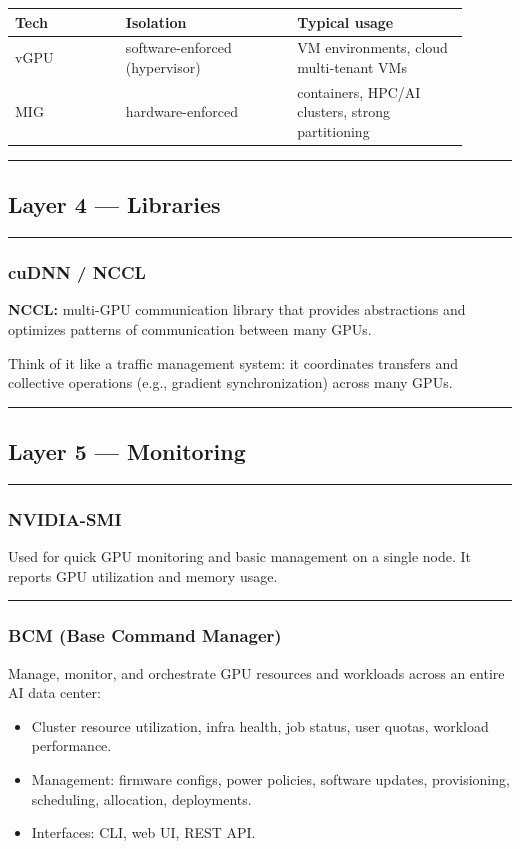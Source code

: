 \documentclass[11pt]{article}
\newcommand{\notespace}{
\vspace{0.8cm}
\hrule
\vspace{0.8cm}
}
\begin{document}
\begin{center}
\renewcommand{\arraystretch}{1.15}
\begin{tabular}{|p{0.22\linewidth}|p{0.34\linewidth}|p{0.34\linewidth}|}
\hline
\textbf{Tech} & \textbf{Isolation} & \textbf{Typical usage} \\
\hline
vGPU & software-enforced (hypervisor) & VM environments, cloud multi-tenant VMs \\
\hline
MIG & hardware-enforced & containers, HPC/AI clusters, strong partitioning \\
\hline
\end{tabular}
\end{center}

\notespace

\subsection{Layer 4 — Libraries}
\notespace

\subsubsection{cuDNN / NCCL}
\textbf{NCCL:} multi-GPU communication library that provides abstractions and optimizes patterns of communication between many GPUs.

Think of it like a traffic management system: it coordinates transfers and collective operations (e.g., gradient synchronization) across many GPUs.

\notespace

\subsection{Layer 5 — Monitoring}
\notespace

\subsubsection{NVIDIA-SMI}
Used for quick GPU monitoring and basic management on a single node. It reports GPU utilization and memory usage.
\notespace

\subsubsection{BCM (Base Command Manager)}
Manage, monitor, and orchestrate GPU resources and workloads across an entire AI data center:
\begin{itemize}
\item Cluster resource utilization, infra health, job status, user quotas, workload performance.
\item Management: firmware configs, power policies, software updates, provisioning, scheduling, allocation, deployments.
\item Interfaces: CLI, web UI, REST API.
\end{itemize}
\end{document}
